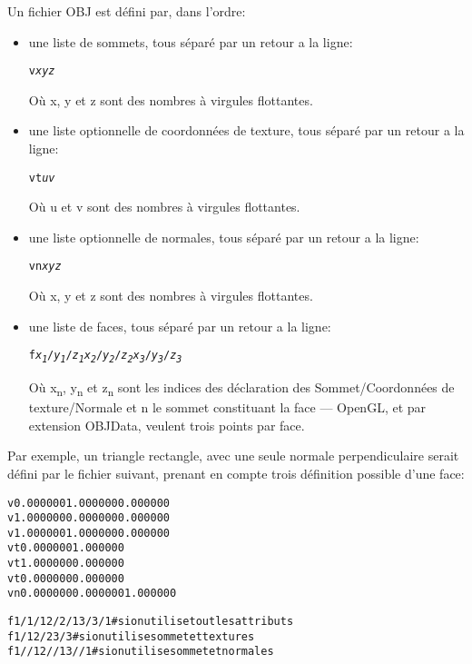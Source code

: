 \documentclass[11pt, a4paper, titlepage]{article}
\begin{document}
Un fichier OBJ est défini par, dans l'ordre:
\begin{itemize}

\item une liste de sommets, tous séparé par un retour a la ligne:
  \begin{alltt}
    v \emph{x} \emph{y} \emph{z}
  \end{alltt}
  Où x, y et z sont des nombres à virgules flottantes.

\item une liste optionnelle de coordonnées de texture, tous séparé par un retour a la ligne:
  \begin{alltt}
    vt \emph{u} \emph{v}
  \end{alltt}
  Où u et v sont des nombres à virgules flottantes.

\item une liste optionnelle de normales, tous séparé par un retour a la ligne:
  \begin{alltt}
    vn \emph{x} \emph{y} \emph{z}
  \end{alltt}
  Où x, y et z sont des nombres à virgules flottantes.

\item une liste de faces, tous séparé par un retour a la ligne:
  \begin{alltt}
    f \emph{x\textsubscript{1}}/\emph{y\textsubscript{1}}/\emph{z\textsubscript{1}} \emph{x\textsubscript{2}}/\emph{y\textsubscript{2}}/\emph{z\textsubscript{2}} \emph{x\textsubscript{3}}/\emph{y\textsubscript{3}}/\emph{z\textsubscript{3}}
  \end{alltt}
  Où x\textsubscript{n}, y\textsubscript{n} et z\textsubscript{n} sont les indices des déclaration des Sommet/Coordonnées de texture/Normale et n
  le sommet constituant la face --- OpenGL, et par extension OBJData, veulent trois points par face.\\

\end{itemize}

Par exemple, un triangle rectangle, avec une seule normale perpendiculaire serait défini par le fichier suivant, prenant en compte trois définition
 possible d'une face:
\begin{alltt}
v  0.000000 1.000000 0.000000
v  1.000000 0.000000 0.000000
v  1.000000 1.000000 0.000000
vt 0.000000 1.000000
vt 1.000000 0.000000
vt 0.000000 0.000000
vn 0.000000 0.000000 1.000000

f 1/1/1 2/2/1 3/3/1 # si on utilise tout les attributs
f 1/1 2/2 3/3       # si on utilise sommet et textures
f 1//1 2//1 3//1    # si on utilise sommet et normales
\end{alltt}
\end{document}
